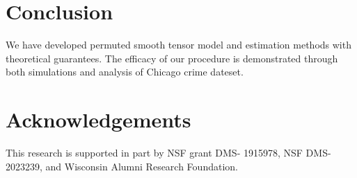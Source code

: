 \documentclass{article}
\theoremstyle{definition}
\begin{document}
\vspace{-.2cm}
\section{Conclusion}\label{sec:con}
\vspace{-.2cm}
We have developed permuted smooth tensor model and estimation methods with theoretical guarantees. 
The efficacy of our procedure is demonstrated through both simulations and analysis of Chicago crime dateset. 










\section*{Acknowledgements}
This research is supported in part by NSF grant DMS- 1915978, NSF DMS-2023239, and Wisconsin Alumni Research Foundation.




\end{document}
